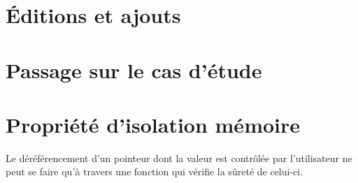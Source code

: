 \section{Éditions et ajouts}
\section{Passage sur le cas d'étude}

\section{Propriété d'isolation mémoire}

Le déréférencement d'un pointeur dont la valeur est contrôlée par l'utilisateur
ne peut se faire qu'à travers une fonction qui vérifie la sûreté de celui-ci.
